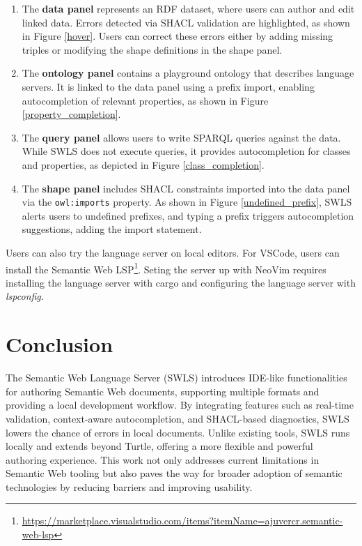 \begin{enumerate}
  \item The \textbf{data panel} represents an RDF dataset, where users can author and edit linked data.
    Errors detected via SHACL validation are highlighted, as shown in Figure \ref{hover}.
    Users can correct these errors either by adding missing triples or modifying the shape definitions in the shape panel.
  \item The \textbf{ontology panel} contains a playground ontology that describes language servers.
    It is linked to the data panel using a prefix import, enabling autocompletion of relevant properties, as shown in Figure \ref{property_completion}.
  \item The \textbf{query panel} allows users to write SPARQL queries against the data. 
    While SWLS does not execute queries, it provides autocompletion for classes and properties, as depicted in Figure \ref{class_completion}.
  \item The \textbf{shape panel} includes SHACL constraints imported into the data panel via the \texttt{owl:imports} property. 
    As shown in Figure \ref{undefined_prefix}, SWLS alerts users to undefined prefixes, and typing a prefix triggers autocompletion suggestions, adding the import statement.
\end{enumerate}

Users can also try the language server on local editors.
For VSCode, users can install the Semantic Web LSP\footnote{\url{https://marketplace.visualstudio.com/items?itemName=ajuvercr.semantic-web-lsp}}.
Seting the server up  with NeoVim requires installing the language server with cargo and configuring the language server with \textit{lspconfig}.

\section{Conclusion}

The Semantic Web Language Server (SWLS) introduces IDE-like functionalities for authoring Semantic Web documents, supporting multiple formats and providing a local development workflow. 
By integrating features such as real-time validation, context-aware autocompletion, and SHACL-based diagnostics, SWLS lowers the chance of errors in local documents.
Unlike existing tools, SWLS runs locally and extends beyond Turtle, offering a more flexible and powerful authoring experience.
This work not only addresses current limitations in Semantic Web tooling but also paves the way for broader adoption of semantic technologies by reducing barriers and improving usability.


